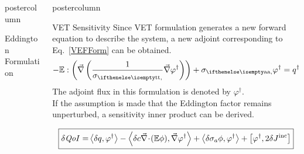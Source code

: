 \documentclass[xcolor={usenames,dvipsnames,svgnames,table}]{beamer}
\newcommand{\vr}{\vec{r}}
\newcommand{\bra}{\left\langle}
\newcommand{\ket}{\right\rangle}
\newcommand{\sbra}{\left[}
\newcommand{\sket}{\right]}
\newcommand{\bound}{\partial V}
\newcommand{\Edd}{\mathbb{E}}
\newcommand{\isigt}{c}
\newcommand{\scalResp}{q^\dag}
\newcommand{\qoi}{{\it QoI}\xspace}
\newlength{\columnheight}
\begin{document}
\begin{frame}
\begin{columns}
\begin{column}{.33\textwidth}
\begin{beamercolorbox}[center,wd=\textwidth]{postercolumn}
\begin{minipage}[T]{0.95\textwidth}
{\begin{block}{Eddington Formulation}
\end{block}
\vfill

			}
			\end{minipage}
		\end{beamercolorbox}
	\end{column}

	\begin{column}{.33\textwidth}
		\begin{beamercolorbox}[center,wd=\textwidth]{postercolumn}
			\begin{minipage}[T]{0.95\textwidth} %
			\parbox[t][\columnheight]{\textwidth}{ %


			    \begin{block}{VET Sensitivity}
Since VET formulation generates a new forward equation to describe the system, a new adjoint corresponding to Eq.~\eqref{VEFForm} can be obtained. 
\begin{equation}
\label{adjForm}
- \Edd : \left( \grad \left( \frac{1}{\sigt}\grad \varphi^\dag \right) \right) + \siga \varphi^\dag = \scalResp %
\end{equation}
The adjoint flux in this formulation is denoted by $\varphi^\dag$.\\

\vspace{1cm}
If the assumption is made that the Eddington factor remains unperturbed, a sensitivity inner product can be derived.


\begin{equation}
\label{SensIP1}
\boxed{
\begin{split}
\delta \qoi =&  \bra \delta q , \varphi^\dag \ket - \bra \delta \isigt \div (\Edd \phi), \grad \varphi^\dag \ket + \bra \delta \sigma_a \phi, \varphi^\dag \ket + \sbra \varphi^\dag, 2 \delta J^{\text{inc}} \sket \\
\end{split}
}
\end{equation}


\end{block}}
\end{minipage}
\end{beamercolorbox}
\end{column}
\end{columns}
\end{frame}
\end{document}
